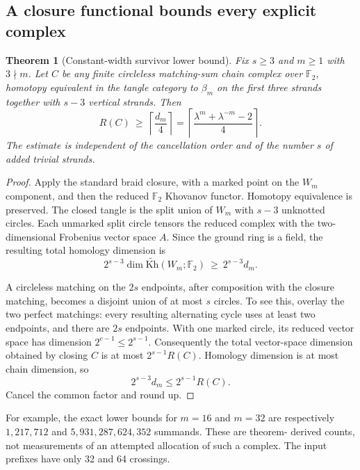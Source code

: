 \documentclass[11pt]{article}
\newtheorem{theorem}{Theorem}[section]
\theoremstyle{definition}
\theoremstyle{remark}
\newcommand{\F}{\mathbb F}
\newcommand{\Kh}{\widetilde{\mathrm{Kh}}}
\begin{document}
\subsection{A closure functional bounds every explicit complex}
\begin{theorem}[Constant-width survivor lower bound]\label{thm:survivors}
Fix $s\ge3$ and $m\ge1$ with $3\nmid m$. Let $C$ be any finite circleless
matching-sum chain complex over $\F_2$, homotopy equivalent in the tangle
category to $\beta_m$ on the first three strands together with $s-3$
vertical strands. Then
\begin{equation}\label{eq:survivorbound}
 R(C)\ \ge\ \left\lceil\frac{d_m}{4}\right\rceil
 =\left\lceil\frac{\lambda^m+\lambda^{-m}-2}{4}\right\rceil.
\end{equation}
The estimate is independent of the cancellation order and of the number
$s$ of added trivial strands.
\end{theorem}
\begin{proof}
Apply the standard braid closure, with a marked point on the $W_m$
component, and then the reduced $\F_2$ Khovanov functor. Homotopy equivalence
is preserved. The closed tangle is the split union of $W_m$ with $s-3$
unknotted circles. Each unmarked split circle tensors the reduced complex
with the two-dimensional Frobenius vector space $A$. Since the ground ring
is a field, the resulting total homology dimension is
\[
 2^{s-3}\dim\Kh(W_m;\F_2)\ \ge\ 2^{s-3}d_m.
\]

A circleless matching on the $2s$ endpoints, after composition with the
closure matching, becomes a disjoint union of at most $s$ circles. To see
this, overlay the two perfect matchings: every resulting alternating cycle
uses at least two endpoints, and there are $2s$ endpoints. With one marked
circle, its reduced vector space has dimension $2^{c-1}\le2^{s-1}$.
Consequently the total vector-space dimension obtained by closing $C$ is
at most $2^{s-1}R(C)$. Homology dimension is at most chain dimension, so
\[
 2^{s-3}d_m\le2^{s-1}R(C).
\]
Cancel the common factor and round up.
\end{proof}

For example, the exact lower bounds for $m=16$ and $m=32$ are respectively
$1{,}217{,}712$ and $5{,}931{,}287{,}624{,}352$ summands. These are theorem-
derived counts, not measurements of an attempted allocation of such a
complex. The input prefixes have only 32 and 64 crossings.
\end{document}
